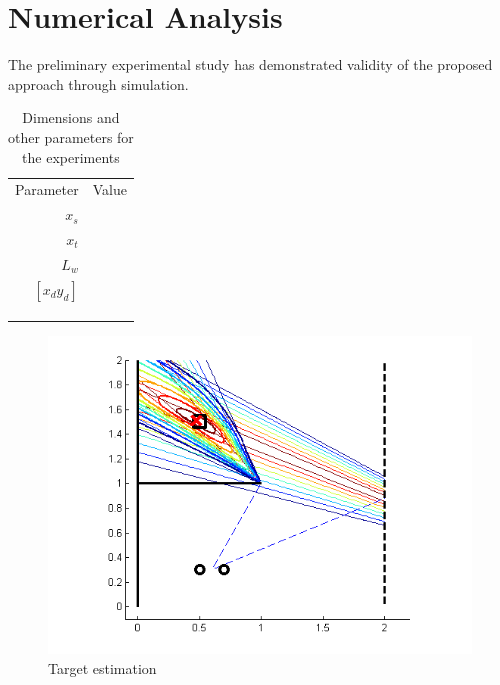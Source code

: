 \documentclass[letterpaper, 10 pt, conference]{ieeeconf}  %
\begin{document}

\section{Numerical Analysis}
The preliminary experimental study has demonstrated validity of the proposed approach through simulation.



\begin{table}[h]
	\centering \caption{Dimensions and other parameters for the experiments}
	\label{tab:experimental_parameter}
	\begin{tabular}{r|r}
		\hline\noalign{\smallskip}
		Parameter & Value \\
 		\noalign{\smallskip}\hline\noalign{\smallskip}
 		$x_s$ &  \\
 		$x_t$ &  \\
 		$L_w$ & \\
 		$[x_d y_d]$ & \\
 		 & \\
 		 & \\
		\noalign{\smallskip}\hline\noalign{\smallskip}
 	\end{tabular}
\end{table}

\begin{figure}[thpb]
  \centering
  \includegraphics[width=\columnwidth]{Figures/estimation.png} %
  \caption{Target estimation}
  \label{fig:data_fusion}
\end{figure}
\end{document}
